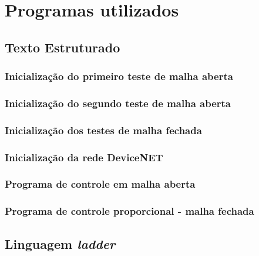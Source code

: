 


\chapter{Programas utilizados}

\section{Texto Estruturado}
\label {stsection}

\subsection{Inicialização do primeiro teste de malha aberta}
\label {stMAinit1}


\subsection{Inicialização do segundo teste de malha aberta}
\label {stMAinit2}


\subsection{Inicialização dos testes de malha fechada}
\label {stMFinit}


\subsection{Inicialização da rede DeviceNET}
\label{dninitST}


\subsection{Programa de controle em malha aberta}
\label{maprogST}


\subsection{Programa de controle proporcional - malha fechada}
\label{mfprogST}


\section{Linguagem \textit{ladder}}
